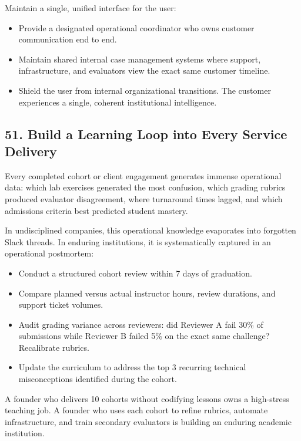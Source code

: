 Maintain a single, unified interface for the user:
\begin{itemize}
    \item Provide a designated operational coordinator who owns customer communication end to end.
    \item Maintain shared internal case management systems where support, infrastructure, and evaluators view the exact same customer timeline.
    \item Shield the user from internal organizational transitions. The customer experiences a single, coherent institutional intelligence.
\end{itemize}

\subsection*{51. Build a Learning Loop into Every Service Delivery}

Every completed cohort or client engagement generates immense operational data: which lab exercises generated the most confusion, which grading rubrics produced evaluator disagreement, where turnaround times lagged, and which admissions criteria best predicted student mastery.

In undisciplined companies, this operational knowledge evaporates into forgotten Slack threads. In enduring institutions, it is systematically captured in an operational postmortem:
\begin{itemize}
    \item Conduct a structured cohort review within 7 days of graduation.
    \item Compare planned versus actual instructor hours, review durations, and support ticket volumes.
    \item Audit grading variance across reviewers: did Reviewer A fail 30\% of submissions while Reviewer B failed 5\% on the exact same challenge? Recalibrate rubrics.
    \item Update the curriculum to address the top 3 recurring technical misconceptions identified during the cohort.
\end{itemize}

A founder who delivers 10 cohorts without codifying lessons owns a high-stress teaching job. A founder who uses each cohort to refine rubrics, automate infrastructure, and train secondary evaluators is building an enduring academic institution.
